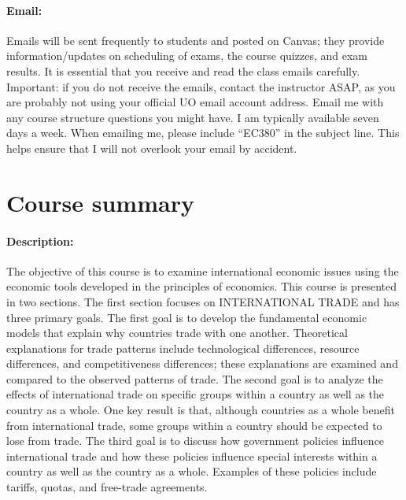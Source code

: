 \documentclass[10pt]{article}
\begin{document}
\paragraph{Email:} Emails will be sent frequently to students and posted on Canvas; they provide information/updates on scheduling of exams, the course quizzes, and exam results.  It is essential that you receive and read the class emails carefully.  Important: if you do not receive the emails, contact the instructor ASAP, as you are probably not using your official UO email account address. 
Email me with any course structure questions you might have.  I am typically available seven days a week.  When emailing me, please include ``EC380” in the subject line.  This helps ensure that I will not overlook your email by accident. 

\section*{Course summary}

\paragraph{Description:} The objective of this course is to examine international economic issues using the economic tools developed in the principles of economics.  This course is presented in two sections. The first section focuses on INTERNATIONAL TRADE and has three primary goals.  The first goal is to develop the fundamental economic models that explain why countries trade with one another.  Theoretical explanations for trade patterns include technological differences, resource differences, and competitiveness differences; these explanations are examined and compared to the observed patterns of trade.  The second goal is to analyze the effects of international trade on specific groups within a country as well as the country as a whole.  One key result is that, although countries as a whole benefit from international trade, some groups within a country should be expected to lose from trade.  The third goal is to discuss how government policies influence international trade and how these policies influence special interests within a country as well as the country as a whole. Examples of these policies include tariffs, quotas, and free-trade agreements. 
 
\bigskip
\end{document}
